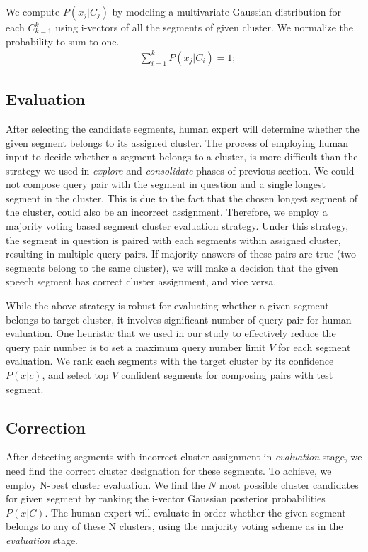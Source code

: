 \documentclass[final,authoryear,5p,times,twocolumn]{elsarticle}
\begin{document}
We compute $P(x_j|C_j)$ by modeling a multivariate Gaussian distribution for each $C_{k=1}^{k}$ using i-vectors of all the segments of given cluster. We normalize the probability to sum to one.
\begin{equation}
\begin{aligned}
&  \sum_{i=1}^{k} P(x_j|C_i) = 1;
\label{jj}
\end{aligned}
\end{equation}
 

\subsection{Evaluation}
After selecting the candidate segments, human expert will determine whether the given segment belongs to its assigned cluster. The process of employing human input to decide whether a segment belongs to a cluster, is more difficult than the strategy we used in \textit{explore} and \textit{consolidate} phases of previous section. We could not compose query pair with the segment in question and a single longest segment in the cluster. This is due to the fact that the chosen longest segment of the cluster, could also be an incorrect assignment. Therefore, we employ a majority voting based segment cluster evaluation strategy. Under this strategy, the segment in question is paired with each segments within assigned cluster, resulting in multiple query pairs. If majority answers of these pairs are true (two segments belong to the same cluster), we will make a decision that the given speech segment has correct cluster assignment, and vice versa. 

While the above strategy is robust for evaluating whether a given segment belongs to target cluster, it involves significant number of query pair for human evaluation. One heuristic that we used in our study to effectively reduce the query pair number is to set a maximum query number limit $V$ for each segment evaluation. We rank each segments with the target cluster by its confidence $P(x|c)$, and select top $V$ confident segments for composing pairs with test segment. 

\subsection{Correction}
After detecting segments with incorrect cluster assignment in \textit{evaluation} stage, we need find the correct cluster designation for these segments. To achieve, we employ N-best cluster evaluation.
We find the $N$ most possible cluster candidates for given segment by ranking the i-vector Gaussian posterior probabilities $P(x|C)$. The human expert will evaluate in order whether the given segment belongs to any of these N clusters, using the majority voting scheme as in the \textit{evaluation} stage. 
\end{document}

